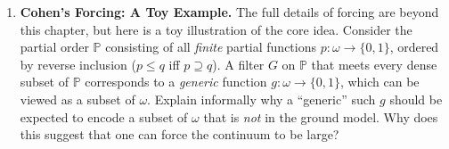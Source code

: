 \begin{enumerate}
    \item[$\star$] \textbf{Cohen's Forcing: A Toy Example.}
    The full details of forcing are beyond this chapter, but here is a toy illustration of the core idea. Consider the partial order $\mathbb{P}$ consisting of all \emph{finite} partial functions $p \colon \omega \to \{0,1\}$, ordered by reverse inclusion ($p \leq q$ iff $p \supseteq q$). A filter $G$ on $\mathbb{P}$ that meets every dense subset of $\mathbb{P}$ corresponds to a \emph{generic} function $g \colon \omega \to \{0,1\}$, which can be viewed as a subset of $\omega$. Explain informally why a ``generic'' such $g$ should be expected to encode a subset of $\omega$ that is \emph{not} in the ground model. Why does this suggest that one can force the continuum to be large?

\end{enumerate}
